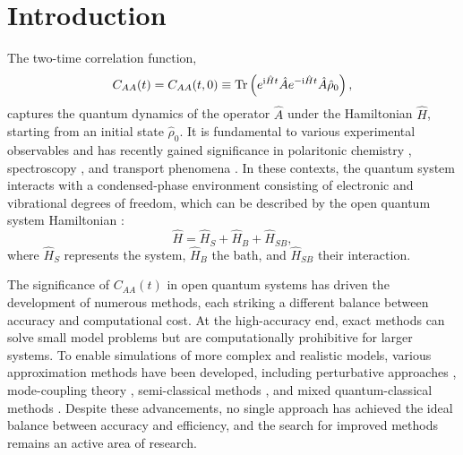 \documentclass[preprint,aip,jcp]{revtex4-2}
\newcommand{\im}{\textup{i}}
\begin{document}
\section{Introduction}
The two-time correlation function,
\begin{equation}\label{eqn:corr}
C_{AA}(t) = C_{AA}(t, 0) \equiv \Tr\left(e^{\im \hat{H} t}\hat{A} e^{-\im \hat{H} t} \hat{A} \hat{\rho}_0\right),
\end{equation}
captures the quantum dynamics of the operator $\hat{A}$ under the Hamiltonian $\hat{H}$, starting from an initial state $\hat{\rho}_0$. It is fundamental to various experimental observables \cite{harp1970corr} and has recently gained significance in polaritonic chemistry \cite{li2021polaritonic, philbin2022cavity, ke2024cavity}, spectroscopy \cite{tanimura2012twodspec, ma2015spec, saraceno2023spec}, and transport phenomena \cite{li2024transport, jasrasaria2024transport}. In these contexts, the quantum system interacts with a condensed-phase environment consisting of electronic and vibrational degrees of freedom, which can be described by the open quantum system Hamiltonian \cite{Breuer2007OQS}:
\begin{equation}\label{eqn:open_system}
    \hat{H} = \hat{H}_{S} + \hat{H}_B + \hat{H}_{SB},
\end{equation}
where $\hat{H}_S$ represents the system, $\hat{H}_B$ the bath, and $\hat{H}_{SB}$ their interaction.

The significance of $C_{AA}(t)$ in open quantum systems has driven the development of numerous methods, each striking a different balance between accuracy and computational cost.  At the high-accuracy end, exact methods \cite{tanimura1989heom,makri1995quapi,jin2008heom,wang2022DEOM} can solve small model problems but are computationally prohibitive for larger systems. To enable simulations of more complex and realistic models, various approximation methods have been developed, including perturbative approaches \cite{redfield1957redfield,Tokuyama1976TCL}, mode-coupling theory \cite{Reichman2002mct1,Reichman2002mct2}, semi-classical methods \cite{Meyer1979MeyerMiller,Stock1997StockThoss,liu2007lscivr}, and mixed quantum-classical methods \cite{tully90fssh,Craig2005TSHKSDFT,Wang2015SH_progress,Mannouch2023MASH}. Despite these advancements, no single approach has achieved the ideal balance between accuracy and efficiency, and the search for improved methods remains an active area of research.
\end{document}
